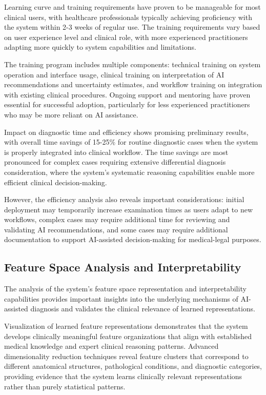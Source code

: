 Learning curve and training requirements have proven to be manageable for most clinical users, with healthcare professionals typically achieving proficiency with the system within 2-3 weeks of regular use. The training requirements vary based on user experience level and clinical role, with more experienced practitioners adapting more quickly to system capabilities and limitations.

The training program includes multiple components: technical training on system operation and interface usage, clinical training on interpretation of AI recommendations and uncertainty estimates, and workflow training on integration with existing clinical procedures. Ongoing support and mentoring have proven essential for successful adoption, particularly for less experienced practitioners who may be more reliant on AI assistance.

Impact on diagnostic time and efficiency shows promising preliminary results, with overall time savings of 15-25\% for routine diagnostic cases when the system is properly integrated into clinical workflow. The time savings are most pronounced for complex cases requiring extensive differential diagnosis consideration, where the system's systematic reasoning capabilities enable more efficient clinical decision-making.

However, the efficiency analysis also reveals important considerations: initial deployment may temporarily increase examination times as users adapt to new workflows, complex cases may require additional time for reviewing and validating AI recommendations, and some cases may require additional documentation to support AI-assisted decision-making for medical-legal purposes.

\subsection{Feature Space Analysis and Interpretability}

The analysis of the system's feature space representation and interpretability capabilities provides important insights into the underlying mechanisms of AI-assisted diagnosis and validates the clinical relevance of learned representations.

Visualization of learned feature representations demonstrates that the system develops clinically meaningful feature organizations that align with established medical knowledge and expert clinical reasoning patterns. Advanced dimensionality reduction techniques reveal feature clusters that correspond to different anatomical structures, pathological conditions, and diagnostic categories, providing evidence that the system learns clinically relevant representations rather than purely statistical patterns.

